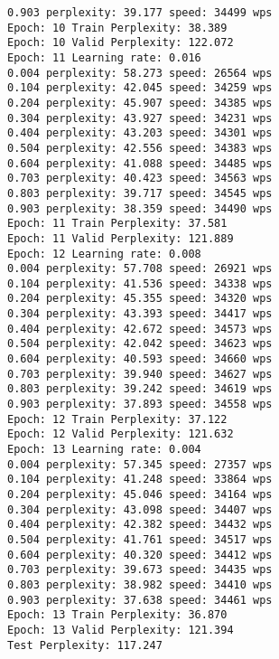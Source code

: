 \documentclass[11pt]{article}
\begin{document}
\begin{Verbatim}[commandchars=\\\{\}]
0.903 perplexity: 39.177 speed: 34499 wps
Epoch: 10 Train Perplexity: 38.389
Epoch: 10 Valid Perplexity: 122.072
Epoch: 11 Learning rate: 0.016
0.004 perplexity: 58.273 speed: 26564 wps
0.104 perplexity: 42.045 speed: 34259 wps
0.204 perplexity: 45.907 speed: 34385 wps
0.304 perplexity: 43.927 speed: 34231 wps
0.404 perplexity: 43.203 speed: 34301 wps
0.504 perplexity: 42.556 speed: 34383 wps
0.604 perplexity: 41.088 speed: 34485 wps
0.703 perplexity: 40.423 speed: 34563 wps
0.803 perplexity: 39.717 speed: 34545 wps
0.903 perplexity: 38.359 speed: 34490 wps
Epoch: 11 Train Perplexity: 37.581
Epoch: 11 Valid Perplexity: 121.889
Epoch: 12 Learning rate: 0.008
0.004 perplexity: 57.708 speed: 26921 wps
0.104 perplexity: 41.536 speed: 34338 wps
0.204 perplexity: 45.355 speed: 34320 wps
0.304 perplexity: 43.393 speed: 34417 wps
0.404 perplexity: 42.672 speed: 34573 wps
0.504 perplexity: 42.042 speed: 34623 wps
0.604 perplexity: 40.593 speed: 34660 wps
0.703 perplexity: 39.940 speed: 34627 wps
0.803 perplexity: 39.242 speed: 34619 wps
0.903 perplexity: 37.893 speed: 34558 wps
Epoch: 12 Train Perplexity: 37.122
Epoch: 12 Valid Perplexity: 121.632
Epoch: 13 Learning rate: 0.004
0.004 perplexity: 57.345 speed: 27357 wps
0.104 perplexity: 41.248 speed: 33864 wps
0.204 perplexity: 45.046 speed: 34164 wps
0.304 perplexity: 43.098 speed: 34407 wps
0.404 perplexity: 42.382 speed: 34432 wps
0.504 perplexity: 41.761 speed: 34517 wps
0.604 perplexity: 40.320 speed: 34412 wps
0.703 perplexity: 39.673 speed: 34435 wps
0.803 perplexity: 38.982 speed: 34410 wps
0.903 perplexity: 37.638 speed: 34461 wps
Epoch: 13 Train Perplexity: 36.870
Epoch: 13 Valid Perplexity: 121.394
Test Perplexity: 117.247

    \end{Verbatim}


    
    
    
    
\end{document}
